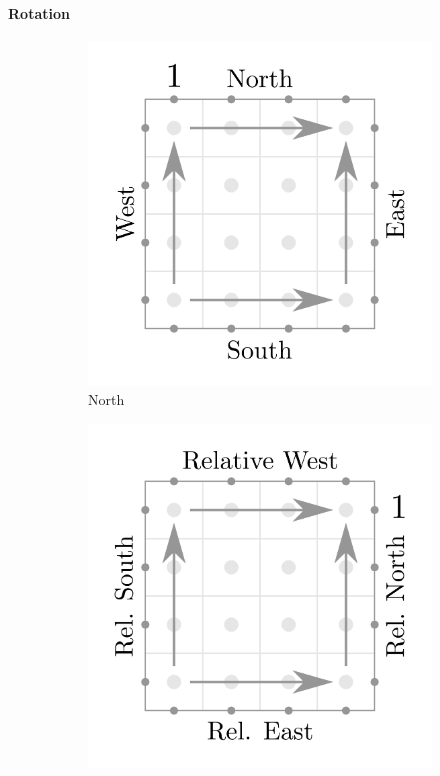 \documentclass[12pt]{article}
\begin{document}
\paragraph{Rotation}
\begin{figure}
    \centering
    \begin{subfigure}[b]{0.30\textwidth}
        \includegraphics[width=\textwidth]{images/north1.pdf}
        \caption{North}
    \end{subfigure}
    \begin{subfigure}[b]{0.30\textwidth}
        \includegraphics[width=\textwidth]{images/east1.pdf}

\end{subfigure}
\end{figure}
\end{document}
